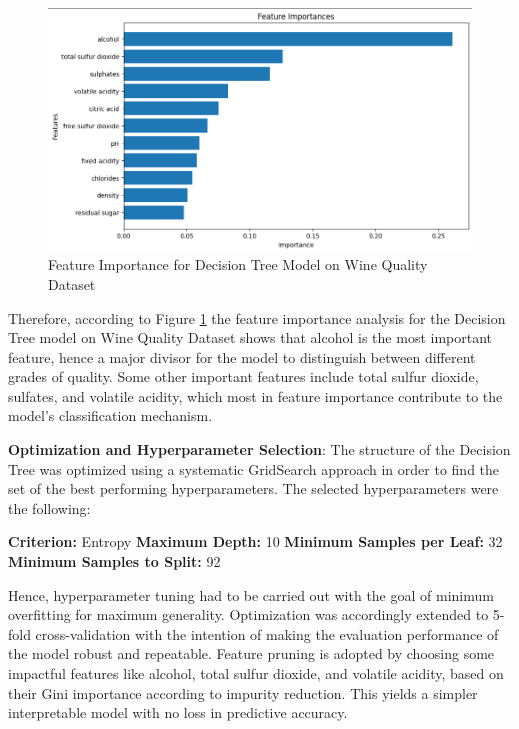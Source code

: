 \documentclass[conference]{IEEEtran}
\begin{document}
\begin{figure}[h] \includegraphics[width=\columnwidth]{plots/dt_wine_feature_importance.png} \caption{Feature Importance for Decision Tree Model on Wine Quality Dataset} \label{fig:dt_feature_importance_wine} \end{figure}

Therefore, according to Figure \ref{fig:dt_feature_importance_wine} the feature importance analysis for the Decision Tree model on Wine Quality Dataset shows that alcohol is the most important feature, hence a major divisor for the model to distinguish between different grades of quality. Some other important features include total sulfur dioxide, sulfates, and volatile acidity, which most in feature importance contribute to the model's classification mechanism.

\textbf{Optimization and Hyperparameter Selection}:
The structure of the Decision Tree was optimized using a systematic GridSearch approach in order to find the set of the best performing hyperparameters. The selected hyperparameters were the following:

\textbf{Criterion:} Entropy
\textbf{Maximum Depth:} 10
\textbf{Minimum Samples per Leaf:} 32
\textbf{Minimum Samples to Split:} 92

Hence, hyperparameter tuning had to be carried out with the goal of minimum overfitting for maximum generality. Optimization was accordingly extended to 5-fold cross-validation with the intention of making the evaluation performance of the model robust and repeatable. Feature pruning is adopted by choosing some impactful features like alcohol, total sulfur dioxide, and volatile acidity, based on their Gini importance according to impurity reduction. This yields a simpler interpretable model with no loss in predictive accuracy.
\end{document}

